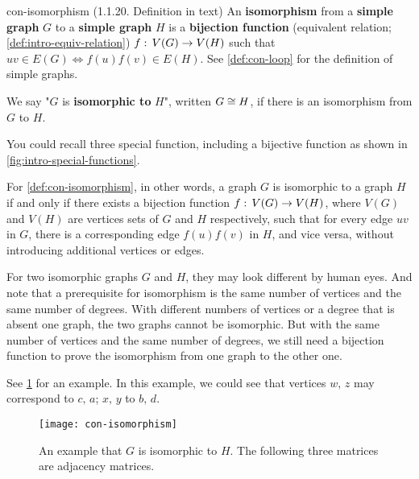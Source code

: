 \documentclass[../src/handouts/main.tex]{subfiles}
\begin{document}
\begin{definition}{}{con-isomorphism}
  (1.1.20. Definition in text)
  An \textbf{isomorphism} from a \textbf{simple graph} $G$ to a \textbf{simple graph} $H$ is a \textbf{bijection function} (equivalent relation; \cref{def:intro-equiv-relation}) $f:\, V(G) \to V(H)$ such that $uv \in E(G) \iff f(u)f(v) \in E(H)$. See \cref{def:con-loop} for the definition of simple graphs.

  We say "$G$ is \textbf{isomorphic to} $H$", written $G \cong H$, if there is an isomorphism from $G$ to $H$.
\end{definition}

You could recall three special function, including a bijective function as shown in \cref{fig:intro-special-functions}.

For \cref{def:con-isomorphism}, in other words, a graph $G$ is isomorphic to a graph $H$ if and only if there exists a bijection function $f:\, V(G) \to V(H)$, where $V(G)$ and $V(H)$ are vertices sets of $G$ and $H$ respectively, such that for every edge $uv$ in $G$, there is a corresponding edge $f(u)f(v)$ in $H$, and vice versa, without introducing additional vertices or edges.

For two isomorphic graphs $G$ and $H$, they may look different by human eyes. And note that a prerequisite for isomorphism is the same number of vertices and the same number of degrees. With different numbers of vertices or a degree that is absent one graph, the two graphs cannot be isomorphic. But with the same number of vertices and the same number of degrees, we still need a bijection function to prove the isomorphism from one graph to the other one.

See \cref{fig:con-isomorphism} for an example. In this example, we could see that vertices $w,\, z$ may correspond to $c,\, a$; $x,\, y$ to $b,\, d$.

\begin{figure}[htbp]
  \centering
  \texttt{[image: con-isomorphism]}
  \caption{An example that $G$ is isomorphic to $H$. The following three matrices are adjacency matrices.}
  \label{fig:con-isomorphism}
\end{figure}
\end{document}
